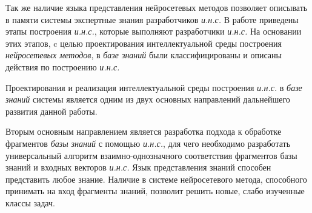 Так же наличие языка представления нейросетевых методов позволяет описывать в памяти системы экспертные знания разработчиков \textit{и.н.с.} В работе приведены этапы построения \textit{и.н.с.}, которые выполняют разработчики \textit{и.н.с.} На основании этих этапов, c целью проектирования интеллектуальной среды построения \textit{нейросетевых методов}, в \textit{базе знаний} были классифицированы и описаны действия по построению \textit{и.н.с.}

Проектирования и реализация интеллектуальной среды построения \textit{и.н.с.} в \textit{базе знаний} системы является одним из двух основных направлений дальнейшего развития данной работы.

Вторым основным направлением является разработка подхода к обработке фрагментов \textit{базы знаний} с помощью \textit{и.н.с.}, для чего необходимо разработать универсальный алгоритм взаимно-однозначного соответствия фрагментов базы знаний и входных векторов \textit{и.н.с.} Язык представления знаний способен представить любое знание. Наличие в системе нейросетевого метода, способного принимать на вход фрагменты знаний, позволит решить новые, слабо изученные классы задач. 